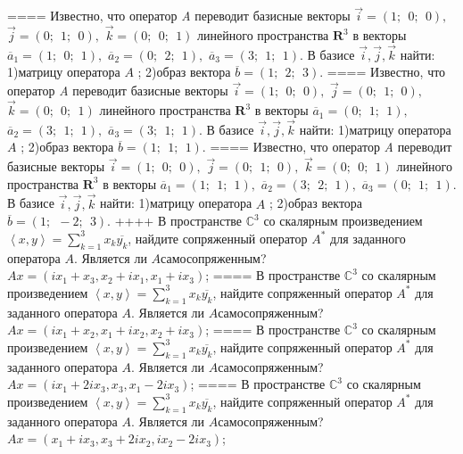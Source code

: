 ====
Известно, что оператор \emph{A} переводит базисные векторы \(\overrightarrow{i} = (1;\ \ 0;\ \ 0),\) \(\overrightarrow{j} = (0;\ \ 1;\ \ 0),\) \(\overrightarrow{k} = (0;\ \ 0;\ \ 1)\) линейного пространства \(\mathbf{R}^{3}\) в векторы \({\overline{a}}_{1} = (1;\ \ 0;\ \ 1),\) \({\overline{a}}_{2} = (0;\ \ 2;\ \ 1),\) \({\overline{a}}_{3} = (3;\ \ 1;\ \ 1).\) В базисе \(\overrightarrow{i},\overrightarrow{j},\overrightarrow{k}\) найти: 1)матрицу оператора \(A\) ; 2)образ вектора \(\overline{b} = (1;\ \ 2;\ \ 3).\)
====
Известно, что оператор \emph{A} переводит базисные векторы \(\overrightarrow{i} = (1;\ \ 0;\ \ 0),\) \(\overrightarrow{j} = (0;\ \ 1;\ \ 0),\) \(\overrightarrow{k} = (0;\ \ 0;\ \ 1)\) линейного пространства \(\mathbf{R}^{3}\) в векторы \({\overline{a}}_{1} = (0;\ \ 1;\ \ 1),\) \({\overline{a}}_{2} = (3;\ \ 1;\ \ 1),\) \({\overline{a}}_{3} = (3;\ \ 1;\ \ 1).\) В базисе \(\overrightarrow{i},\overrightarrow{j},\overrightarrow{k}\) найти: 1)матрицу оператора \(A\) ; 2)образ вектора \(\overline{b} = (1;\ \ 1;\ \ 1).\)
====
Известно, что оператор \emph{A} переводит базисные векторы \(\overrightarrow{i} = (1;\ \ 0;\ \ 0),\) \(\overrightarrow{j} = (0;\ \ 1;\ \ 0),\) \(\overrightarrow{k} = (0;\ \ 0;\ \ 1)\) линейного пространства \(\mathbf{R}^{3}\) в векторы \({\overline{a}}_{1} = (1;\ \ 1;\ \ 1),\) \({\overline{a}}_{2} = (3;\ \ 2;\ \ 1),\) \({\overline{a}}_{3} = (0;\ \ 1;\ \ 1).\) В базисе \(\overrightarrow{i},\overrightarrow{j},\overrightarrow{k}\) найти: 1)матрицу оператора \(A\) ; 2)образ вектора \(\overline{b} = (1;\ \  - 2;\ \ 3).\)
++++
В пространстве \(\mathbb{C}^{3}\) со скалярным произведением \(\left\langle x,y \right\rangle = \sum_{k = 1}^{3}{x_{k}\overline{y_{k}}}\), найдите сопряженный оператор \(A^{*}\) для заданного оператора \(A\). Является ли \(A\)самосопряженным? \(Ax = \left( ix_{1} + x_{3},x_{2} + ix_{1},x_{1} + ix_{3} \right)\);
====
В пространстве \(\mathbb{C}^{3}\) со скалярным произведением \(\left\langle x,y \right\rangle = \sum_{k = 1}^{3}{x_{k}\overline{y_{k}}}\), найдите сопряженный оператор \(A^{*}\) для заданного оператора \(A\). Является ли \(A\)самосопряженным? \(Ax = \left( ix_{1} + x_{2},x_{1} + ix_{2},x_{2} + ix_{3} \right)\);
====
В пространстве \(\mathbb{C}^{3}\) со скалярным произведением \(\left\langle x,y \right\rangle = \sum_{k = 1}^{3}{x_{k}\overline{y_{k}}}\), найдите сопряженный оператор \(A^{*}\) для заданного оператора \(A\). Является ли \(A\)самосопряженным? \(Ax = \left( ix_{1} + 2ix_{3},x_{3},x_{1} - 2ix_{3} \right)\);
====
В пространстве \(\mathbb{C}^{3}\) со скалярным произведением \(\left\langle x,y \right\rangle = \sum_{k = 1}^{3}{x_{k}\overline{y_{k}}}\), найдите сопряженный оператор \(A^{*}\) для заданного оператора \(A\). Является ли \(A\)самосопряженным? \(Ax = \left( x_{1} + ix_{3},x_{3} + 2ix_{2},ix_{2} - 2ix_{3} \right)\);
